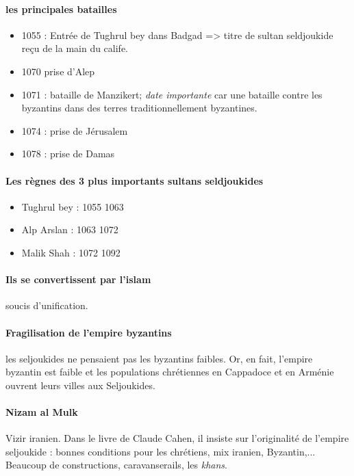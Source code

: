 \paragraph{les principales batailles}

\begin{itemize}
    \item 1055
: Entrée de Tughrul bey dans
Badgad => titre de sultan seldjoukide
reçu de la main du calife.
    \item 1070
prise d’Alep
    \item 1071
: bataille de Manzikert; \textit{date importante} car une bataille contre les byzantins dans des terres traditionnellement byzantines. 
    \item 1074
: prise de Jérusalem
    \item 1078
: prise de Damas

\end{itemize}


 \paragraph{ Les règnes des 3 plus importants
sultans seldjoukides}
\begin{itemize}
    \item Tughrul
bey : 1055 1063
    \item Alp Arslan : 1063
1072
    \item Malik Shah : 1072
1092
\end{itemize}


\paragraph{Ils se convertissent par l'islam} soucis d'unification. 

\paragraph{Fragilisation de l'empire byzantins} les seljoukides ne pensaient pas les byzantins faibles. Or, en fait, l'empire byzantin est faible et les populations chrétiennes en Cappadoce et en Arménie ouvrent leurs villes aux Seljoukides.


\paragraph{Nizam al Mulk} Vizir iranien.
Dans le livre de Claude Cahen, il insiste sur l'originalité de l'empire seljoukide : bonnes conditions pour les chrétiens, mix iranien, Byzantin,... 
Beaucoup de constructions, caravanserails, les \textit{khans}. 

